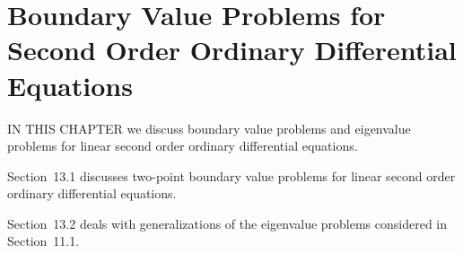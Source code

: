 \chapter{Boundary Value Problems for Second Order Ordinary Differential Equations}

\noindent
IN THIS CHAPTER we discuss boundary value problems and eigenvalue problems for linear second order
ordinary differential equations.

\medskip
\noindent
Section~13.1 discusses two-point boundary value problems for linear second order ordinary
differential equations.

\medskip
\noindent
Section~13.2 deals with generalizations of the eigenvalue problems considered in Section~11.1.

\newpage




